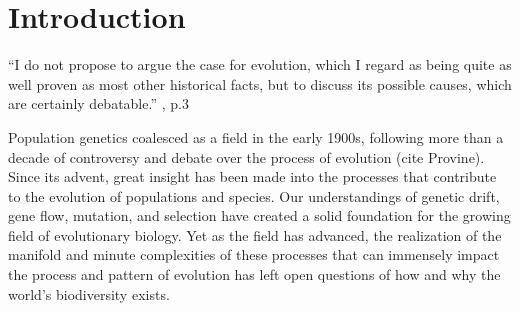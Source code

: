 \chapter{Introduction}
\label{chap:introduction}

\begin{quoteshrink}
  ``I do not propose to argue the case for evolution, which I regard as being quite as well proven as most other historical facts, but to discuss its possible causes, which are certainly debatable.''
  \hfill\citet{Haldane:1932}, p.3
\end{quoteshrink}

\noindent



Population genetics coalesced as a field in the early 1900s, following more than a decade of controversy and debate over the process of evolution (cite Provine). Since its advent, great insight has been made into the processes that contribute to the evolution of populations and species. Our understandings of genetic drift, gene flow, mutation, and selection have created a solid foundation for the growing field of evolutionary biology. Yet as the field has advanced, the realization of the manifold and minute complexities of these processes that can  immensely impact the process and pattern of evolution has left open questions of how and why the world's biodiversity exists.

